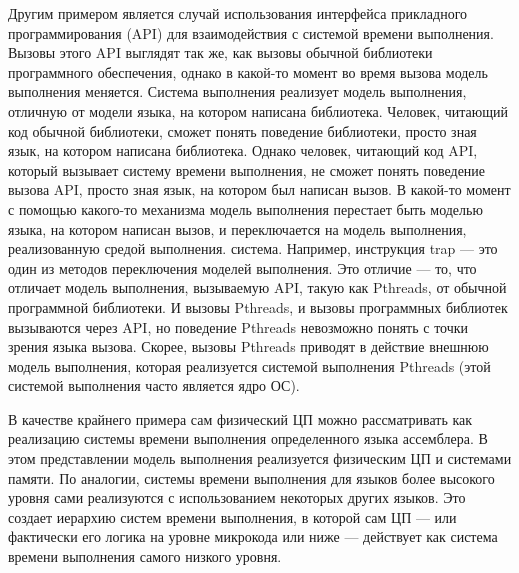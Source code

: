 Другим примером является случай использования интерфейса прикладного программирования (API) для взаимодействия с системой времени выполнения. Вызовы этого API выглядят так же, как вызовы обычной библиотеки программного обеспечения, однако в какой-то момент во время вызова модель выполнения меняется. Система выполнения реализует модель выполнения, отличную от модели языка, на котором написана библиотека. Человек, читающий код обычной библиотеки, сможет понять поведение библиотеки, просто зная язык, на котором написана библиотека. Однако человек, читающий код API, который вызывает систему времени выполнения, не сможет понять поведение вызова API, просто зная язык, на котором был написан вызов. В какой-то момент с помощью какого-то механизма модель выполнения перестает быть моделью языка, на котором написан вызов, и переключается на модель выполнения, реализованную средой выполнения. система. Например, инструкция trap — это один из методов переключения моделей выполнения. Это отличие — то, что отличает модель выполнения, вызываемую API, такую как Pthreads, от обычной программной библиотеки. И вызовы Pthreads, и вызовы программных библиотек вызываются через API, но поведение Pthreads невозможно понять с точки зрения языка вызова. Скорее, вызовы Pthreads приводят в действие внешнюю модель выполнения, которая реализуется системой выполнения Pthreads (этой системой выполнения часто является ядро ОС).

В качестве крайнего примера сам физический ЦП можно рассматривать как реализацию системы времени выполнения определенного языка ассемблера. В этом представлении модель выполнения реализуется физическим ЦП и системами памяти. По аналогии, системы времени выполнения для языков более высокого уровня сами реализуются с использованием некоторых других языков. Это создает иерархию систем времени выполнения, в которой сам ЦП — или фактически его логика на уровне микрокода или ниже — действует как система времени выполнения самого низкого уровня.

